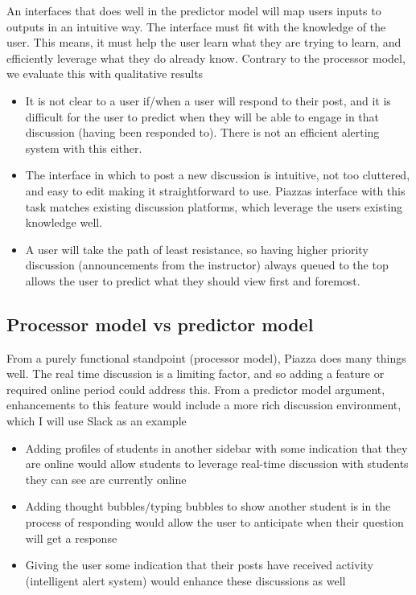 An interfaces that does well in the predictor model will map users inputs to outputs in an intuitive way. The interface must fit with the knowledge of the user. This means, it must help the user learn what they are trying to learn, and efficiently leverage what they do already know. Contrary to the processor model, we evaluate this with qualitative results

\begin{itemize}
\item
  It is not clear to a user if/when a user will respond to their post, and it is difficult for the user to predict when they will be able to engage in that discussion (having been responded to). There is not an efficient alerting system with this either.
\item
  The interface in which to post a new discussion is intuitive, not too cluttered, and easy to edit making it straightforward to use. Piazzas interface with this task matches existing discussion platforms, which leverage the users existing knowledge well.
\item
  A user will take the path of least resistance, so having higher priority discussion (announcements from the instructor) always queued to the top allows the user to predict what they should view first and foremost.
\end{itemize}

\subsection{Processor model vs predictor model}

From a purely functional standpoint (processor model), Piazza does many things well. The real time discussion is a limiting factor, and so adding a feature or required online period could address this. From a predictor model argument, enhancements to this feature would include a more rich discussion environment, which I will use Slack as an example

\begin{itemize}
\item
  Adding profiles of students in another sidebar with some indication that they are online would allow students to leverage real-time discussion with students they can see are currently online
\item
  Adding thought bubbles/typing bubbles to show another student is in the process of responding would allow the user to anticipate when their question will get a response
\item
  Giving the user some indication that their posts have received activity (intelligent alert system) would enhance these discussions as well
\end{itemize}

